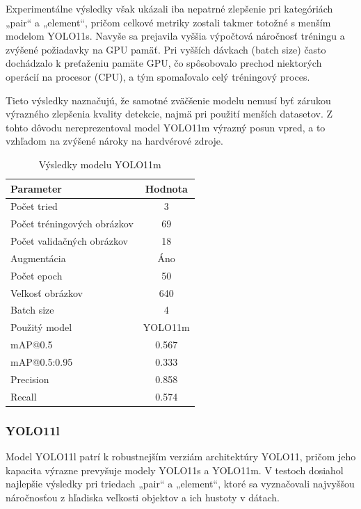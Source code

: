             Experimentálne výsledky však ukázali iba nepatrné zlepšenie pri kategóriách „pair“ a „element“, pričom celkové metriky zostali takmer totožné s menším modelom YOLO11s. Navyše sa prejavila vyššia výpočtová náročnosť tréningu a zvýšené požiadavky na GPU pamäť. Pri vyšších dávkach (batch size) často dochádzalo k preťaženiu pamäte GPU, čo spôsobovalo prechod niektorých operácií na procesor (CPU), a tým spomaľovalo celý tréningový proces.

            Tieto výsledky naznačujú, že samotné zväčšenie modelu nemusí byť zárukou výrazného zlepšenia kvality detekcie, najmä pri použití menších datasetov. Z tohto dôvodu nereprezentoval model YOLO11m výrazný posun vpred, a to vzhľadom na zvýšené nároky na hardvérové zdroje.           
            \begin{table}[H]
            \centering
                \begin{tabular}{|l|c|}
                \hline
                \textbf{Parameter} & \textbf{Hodnota} \\ \hline
                Počet tried & 3 \\ \hline
                Počet tréningových obrázkov & 69 \\ \hline
                Počet validačných obrázkov & 18 \\ \hline
                Augmentácia & Áno \\ \hline
                Počet epoch & 50 \\ \hline
                Veľkosť obrázkov & 640 \\ \hline
                Batch size & 4 \\ \hline
                Použitý model & YOLO11m \\ \hline
                mAP@0.5 & 0.567 \\ \hline
                mAP@0.5:0.95 & 0.333 \\ \hline
                Precision & 0.858 \\ \hline
                Recall & 0.574 \\ \hline
                \end{tabular}
                \caption{Výsledky modelu YOLO11m}
                \label{tab:yolo11m}
            \end{table}

            \subsubsection{YOLO11l}
            Model YOLO11l patrí k robustnejším verziám architektúry YOLO11, pričom jeho kapacita výrazne prevyšuje modely YOLO11s a YOLO11m. V testoch dosiahol najlepšie výsledky pri triedach „pair“ a „element“, ktoré sa vyznačovali najvyššou náročnosťou z hľadiska veľkosti objektov a ich hustoty v dátach.

